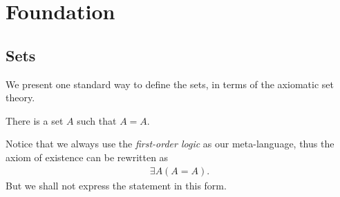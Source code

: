 
\chapter{Foundation}

\section{Sets}

\begin{comment}
We begin with na\"ive set theory. A \emph{set} $A$ is an unordered collection of objects. If $x$ is an object and if $x$ lies in $A$, we say that $x$ is an element of $A$, and we write
    \begin{align*}
        x \in A,
    \end{align*}
otherwise, we write
    \begin{align*}
        x \notin A.
    \end{align*}

If $A, B$ are sets and if every element of $A$ is an element of $B$, we say that $A$ is a \emph{subset} of $B$, and we write
    \begin{align*}
        A \subset B.
    \end{align*}
\end{comment}

We present one standard way to define the sets, in terms of the axiomatic set theory.

\begin{comment}
\begin{axiom}[Axiom of existence]
    There is a set and every set is an object. Given two sets $A$ and $B$, it is meaningful to ask whether $A$ is an element of $B$. If $A$ is an element of $B$, we write $A \in B$; otherwise, we write $A \notin B$.
\end{axiom}
\end{comment}

\begin{axiom}\label{axiom:existence}
    There is a set $A$ such that $A = A$.
\end{axiom}

Notice that we always use the \emph{first-order logic} as our meta-language, thus the axiom of existence can be rewritten as
    \begin{align*}
        \exists A(A = A).
    \end{align*}
But we shall not express the statement in this form.

